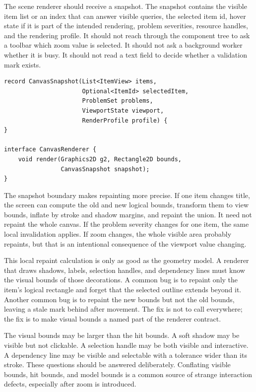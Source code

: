 The scene renderer should receive a snapshot. The snapshot contains the visible item list or an index that can answer visible queries, the selected item id, hover state if it is part of the intended rendering, problem severities, resource handles, and the rendering profile. It should not reach through the component tree to ask a toolbar which zoom value is selected. It should not ask a background worker whether it is busy. It should not read a text field to decide whether a validation mark exists.

\begin{lstlisting}[caption={A snapshot-oriented render call.}]
record CanvasSnapshot(List<ItemView> items,
                      Optional<ItemId> selectedItem,
                      ProblemSet problems,
                      ViewportState viewport,
                      RenderProfile profile) {
}

interface CanvasRenderer {
    void render(Graphics2D g2, Rectangle2D bounds,
                CanvasSnapshot snapshot);
}
\end{lstlisting}

The snapshot boundary makes repainting more precise. If one item changes title, the screen can compute the old and new logical bounds, transform them to view bounds, inflate by stroke and shadow margins, and repaint the union. It need not repaint the whole canvas. If the problem severity changes for one item, the same local invalidation applies. If zoom changes, the whole visible area probably repaints, but that is an intentional consequence of the viewport value changing.

This local repaint calculation is only as good as the geometry model. A renderer that draws shadows, labels, selection handles, and dependency lines must know the visual bounds of those decorations. A common bug is to repaint only the item's logical rectangle and forget that the selected outline extends beyond it. Another common bug is to repaint the new bounds but not the old bounds, leaving a stale mark behind after movement. The fix is not to call  everywhere; the fix is to make visual bounds a named part of the renderer contract.

The visual bounds may be larger than the hit bounds. A soft shadow may be visible but not clickable. A selection handle may be both visible and interactive. A dependency line may be visible and selectable with a tolerance wider than its stroke. These questions should be answered deliberately. Conflating visible bounds, hit bounds, and model bounds is a common source of strange interaction defects, especially after zoom is introduced.

